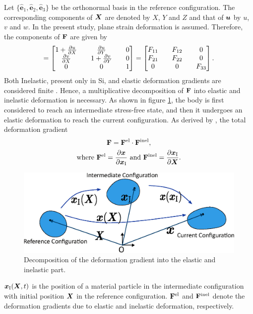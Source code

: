 Let $\{\hat{\bm{e}}_1, \hat{\bm{e}}_2, \hat{\bm{e}}_3\}$ be the orthonormal basis in the reference configuration. The corresponding components of ${\bm{X}}$ are denoted by $X$, $Y$ and $Z$ and that of ${\bm{u}}$ by $u$, $v$ and $w$. In the present study, plane strain deformation is assumed. Therefore, the components of $\mathbf{F}$ are given by \citep{2009ContMechLai} 
\begin{align}
[\F] = 
\begin{bmatrix}
       1 + \pdiff{u}{X} && \pdiff{u}{Y} && 0 \\
       \pdiff{v}{X} && 1 + \pdiff{v}{Y} && 0 \\
       0 && 0 && 1
\end{bmatrix} = \tensor{F}. \label{eq:F_tensor}
\end{align}
Both Inelastic, present only in Si, and elastic deformation gradients are considered finite \citep{2011JMPSBower}. Hence, a multiplicative decomposition of $\mathbf{F}$ into elastic and inelastic deformation is necessary. As shown in figure \ref{fig:decomposition}, the body is first considered to reach an intermediate stress-free state, and then it undergoes an elastic deformation to reach the current configuration. As derived by \citet{1969Lee}, the total deformation gradient   
\begin{gather}
\mathbf{F} = \mathbf{F}^{{\rm{el}}} \cdot  \mathbf{F}^{{\rm{inel}}} \label{eq:F_decomposition}, \\
\text{where } \mathbf{F}^{{\rm{el}}} = \frac{\partial {\bm{x}}}{\partial {\bm{x}}_{\rm{I}}} \text{ and } \mathbf{F}^{{\rm{inel}}} = \frac{\partial {\bm{x}}_{{\rm{I}}}}{\partial {\bm{X}}} \nonumber.
\end{gather}
\begin{figure}[H]
    \centering
    \includegraphics[width=\textwidth]{figures/mathFormFigs/decomposition.eps}
    \caption{Decomposition of the deformation gradient into the elastic and inelastic part.}
    \label{fig:decomposition}
\end{figure}
${\bm{x}}_{\rm{I}}({\bm{X}}, t)$ is the position of a material particle in the intermediate configuration with initial position ${\bm{X}}$ in the reference configuration. $\mathbf{F}^{{\rm{el}}}$ and $\mathbf{F}^{{\rm{inel}}}$ denote the deformation gradients due to elastic and inelastic deformation, respectively.

